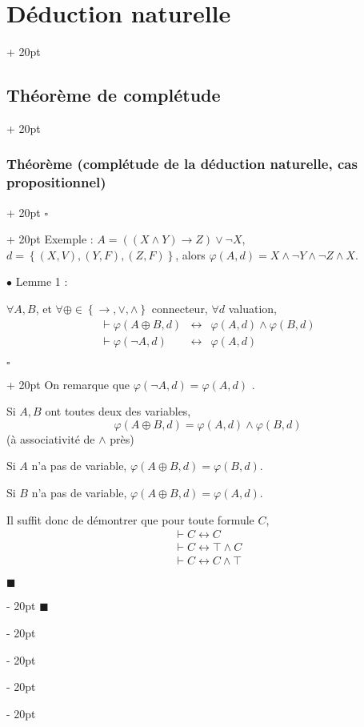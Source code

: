 \documentclass[a4paper, 12pt, twoside]{article}
\newcommand{\set}[1]{\left\{ #1 \right\}}
\newcommand{\ind}[1][20pt]{\advance\leftskip + #1}
\newcommand{\deind}[1][20pt]{\advance\leftskip - #1}
\newenvironment{indt}[2][20pt]{#2 \par \ind[#1]}{\par \deind} %
\newenvironment{proof}[1][{}]{\begin{indt}{$\square$ #1}}{$\blacksquare$ \end{indt}}
\begin{document}
\begin{indt}{\section{Déduction naturelle}}
\begin{indt}{\subsection{Théorème de complétude}}
\begin{indt}{\subsubsection{Théorème (complétude de la déduction naturelle, cas propositionnel)}}
\begin{proof}
                    Exemple : $A = ((X \wedge Y) \rightarrow Z) \vee \neg X$,
                    $d = \set{(X, V), (Y, F), (Z, F)}$, alors
                    $\varphi(A, d) = X \wedge \neg Y \wedge \neg Z \wedge X$.

                    \vspace{6pt}
                    
                    $\bullet$ Lemme 1 :
                    \begin{emphBox}
                        $\forall A, B$, et $\forall \oplus \in \set{\rightarrow, \vee, \wedge}$ connecteur, $\forall d$ valuation,
                        \[
                            \begin{array}{rcl}
                                \vdash \varphi(A \oplus B, d)
                                &\leftrightarrow& \varphi(A, d) \wedge \varphi(B, d)
                                \\
                                \vdash \varphi(\neg A, d)
                                &\leftrightarrow& \varphi(A, d)
                            \end{array}
                        \]
                    \end{emphBox}

                    \begin{proof}
                        On remarque que $\varphi(\neg A, d) = \varphi(A, d)$ .

                        Si $A, B$ ont toutes deux des variables,
                        \[
                            \varphi(A \oplus B, d) = \varphi(A, d) \wedge \varphi(B, d)
                        \]
                        (à associativité de $\wedge$ près)

                        Si $A$ n'a pas de variable, $\varphi(A \oplus B, d) = \varphi(B, d)$.

                        Si $B$ n'a pas de variable, $\varphi(A \oplus B, d) = \varphi(A, d)$.

                        Il suffit donc de démontrer que pour toute formule $C$,
                        \[
                            \begin{array}{l}
                                \vdash C \leftrightarrow C
                                \\
                                \vdash C \leftrightarrow \top \wedge C
                                \\
                                \vdash C \leftrightarrow C \wedge \top
                            \end{array}
                        \]


\end{proof}
\end{proof}
\end{indt}
\end{indt}
\end{indt}
\end{document}
